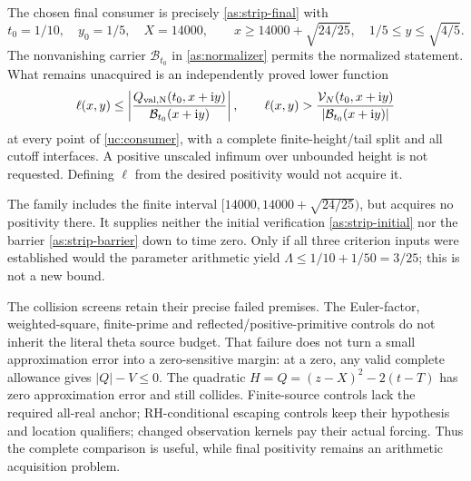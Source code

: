 The chosen final consumer is precisely \eqref{as:strip-final} with
\begin{equation}
 t_0=1/10,\quad y_0=1/5,\quad X=14000,\qquad
 x\ge14000+\sqrt{24/25},\quad 1/5\le y\le\sqrt{4/5}.
 \label{uc:consumer}
\end{equation}
The nonvanishing carrier $\mathcal B_{t_0}$ in
\eqref{as:normalizer} permits the normalized statement. What remains
unacquired is an independently proved lower function
\[
 \ell(x,y)\le
 \left|\frac{Q_{\rm val,N}(t_0,x+\mathrm i y)}{\mathcal B_{t_0}(x+\mathrm i y)}\right|,
 \qquad
 \ell(x,y)>\frac{\mathcal V_N(t_0,x+\mathrm i y)}
 {|\mathcal B_{t_0}(x+\mathrm i y)|}
\]
at every point of \eqref{uc:consumer}, with a complete finite-height/tail
split and all cutoff interfaces. A positive unscaled infimum over
unbounded height is not requested. Defining $\ell$ from the desired
positivity would not acquire it.

The family includes the finite interval
$[14000,14000+\sqrt{24/25})$, but acquires no positivity there.
It supplies neither the initial verification \eqref{as:strip-initial}
nor the barrier \eqref{as:strip-barrier} down to time zero. Only if
all three criterion inputs were established would the parameter
arithmetic yield $\Lambda\le1/10+1/50=3/25$; this is not a new bound.

The collision screens retain their precise failed premises. The
Euler-factor, weighted-square, finite-prime and reflected/positive-primitive
controls do not inherit the literal theta source budget. That failure
does not turn a small approximation error into a zero-sensitive margin:
at a zero, any valid complete allowance gives $|Q|-V\le0$.
The quadratic $H=Q=(z-X)^2-2(t-T)$ has zero approximation error and
still collides. Finite-source controls lack the required all-real anchor;
RH-conditional escaping controls keep their hypothesis and location
qualifiers; changed observation kernels pay their actual forcing.
Thus the complete comparison is useful, while final positivity remains
an arithmetic acquisition problem.

